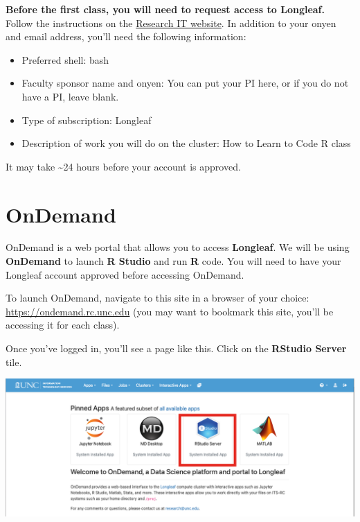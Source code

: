 \documentclass[
  letterpaper,
  DIV=11,
  numbers=noendperiod]{scrreprt}
\begin{document}
\textbf{Before the first class, you will need to request access to
Longleaf.} Follow the instructions on the
\href{https://help.rc.unc.edu/request-a-cluster-account}{Research IT
website}. In addition to your onyen and email address, you'll need the
following information:

\begin{itemize}
\item
  Preferred shell: bash
\item
  Faculty sponsor name and onyen: You can put your PI here, or if you do
  not have a PI, leave blank.
\item
  Type of subscription: Longleaf
\item
  Description of work you will do on the cluster: How to Learn to Code R
  class
\end{itemize}

It may take \textasciitilde24 hours before your account is approved.

\section{OnDemand}\label{ondemand}

OnDemand is a web portal that allows you to access \textbf{Longleaf}. We
will be using \textbf{OnDemand} to launch \textbf{R Studio} and run
\textbf{R} code. You will need to have your Longleaf account approved
before accessing OnDemand.

To launch OnDemand, navigate to this site in a browser of your choice:
\href{https://ondemand.rc.unc.edu/}{https://ondemand.rc.unc.edu} (you
may want to bookmark this site, you'll be accessing it for each class).

Once you've logged in, you'll see a page like this. Click on the
\textbf{RStudio Server} tile.

\begin{center}
\includegraphics{scripts/00_intro/class0_images/Picture1.png}
\end{center}
\end{document}
